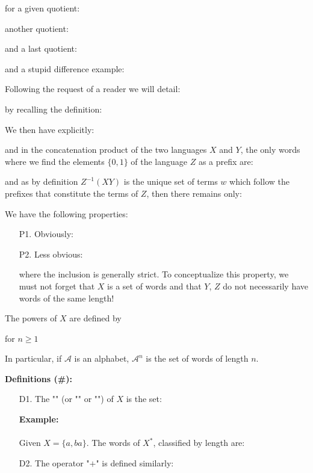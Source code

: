 	\begin{tcolorbox}[colframe=black,colback=white,sharp corners]
	for a given quotient:
	
	another quotient:
	
	and a last quotient:
	
	and a stupid difference example:
	
	Following the request of a reader we will detail:
	
	by recalling the definition:
	
	We then have explicitly:
	
	and in the concatenation product of the two languages $X$ and $Y$, the only words where we find the elements $\{0,1\}$ of the language $Z$ as a prefix are:
	
	and as by definition $Z^{-1}(XY)$ is the unique set of terms $w$ which follow the prefixes that constitute the terms of $Z$, then there remains only:
	
	\end{tcolorbox}
	We have the following properties:
	\begin{enumerate}
		\item[P1.] Obviously:
		

		\item[P2.] Less obvious:
		
		where the inclusion is generally strict. To conceptualize this property, we must not forget that $X$ is a set of words and that $Y$, $Z$ do not necessarily have words of the same length!
	\end{enumerate}	
	The powers of $X$ are defined by
	
	for $n\geq 1$

	In particular, if $\mathcal{A}$ is an alphabet, $\mathcal{A}^n$ is the set of words of length $n$.
	
	\textbf{Definitions (\#\mydef):}
	\begin{enumerate}
		\item[D1.] The "\index{}" (or "" or "") of $X$ is the set:
		
		\begin{tcolorbox}[colframe=black,colback=white,sharp corners]
		\textbf{{\Large {}}Example:}\\\\
		Given $X=\{a,ba\}$. The words of $X^{*}$, classified by length are:
		
		\end{tcolorbox}
	
		\item[D2.] The operator "$+$" is defined similarly:
		
	\end{enumerate}
	
